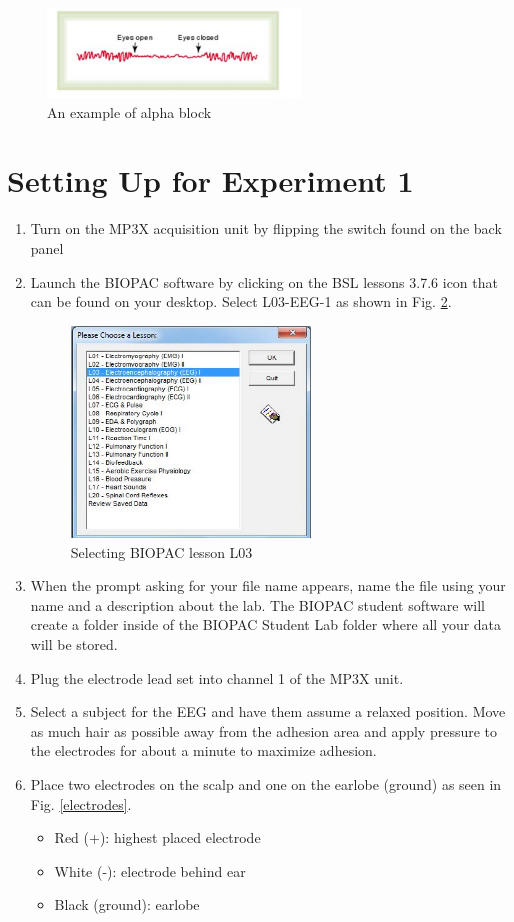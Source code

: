 \documentclass{article}
\begin{document}
\begin{figure}[h]
\centering
\includegraphics[width=0.6\textwidth]{../images/EEG_3.jpg}	
\caption{An example of alpha block}
\label{alphablock}
\end{figure}

\section*{Setting Up for Experiment 1}
\begin{enumerate}
	\item Turn on the MP3X acquisition unit by flipping the switch found on the back panel
	\item Launch the BIOPAC software by clicking on the BSL lessons 3.7.6 icon that can be found on your desktop. Select L03-EEG-1 as shown in Fig. \ref{lesson}.
		\begin{figure}[h]
		\centering
	\includegraphics[width=0.6\textwidth]{../images/EEG_4.jpg}	
		\caption{Selecting BIOPAC lesson L03}
		\label{lesson}
		\end{figure}

	\item When the prompt asking for your file name appears, name the file using your name and a description about the lab. The BIOPAC student software will create a folder inside of the BIOPAC Student Lab folder where all your data will be stored.
	\item Plug the electrode lead set into channel 1 of the MP3X unit.
	\item Select a subject for the EEG and have them assume a relaxed position. Move as much hair as possible away from the adhesion area and apply pressure to the electrodes for about a minute to maximize adhesion.
	\item Place two electrodes on the scalp and one on the earlobe (ground) as seen in Fig. \ref{electrodes}.
		\begin{itemize}
			\item Red (+): highest placed electrode
			\item White (-): electrode behind ear
			\item Black (ground): earlobe
		\end{itemize}
		

\end{enumerate}
\end{document}
